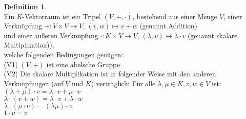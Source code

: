 \documentclass[10pt,a4paper,numbers=endperiod]{scrartcl}
\theoremstyle{definition}
\newtheorem{defi}[satz]{Definition}
\begin{document}
\begin{defi}
	$ $ \\
	Ein $K$-Vektorraum ist ein Tripel $(V,+, \cdot)$, bestehend aus einer Menge $V$, einer Verknüpfung $+: V \times V \rightarrow V$, $(v,w) \mapsto v+w$ (genannt Addition)\\
	und einer äußeren Verknüpfung $\cdot: K \times V \rightarrow V$, $(\lambda, v) \mapsto \lambda \cdot v$ (genannt skalare Multiplikation)),\\
	welche folgenden Bedingungen genügen: \\
	(V1) $(V,+)$ ist eine abelsche Gruppe\\
	(V2) Die skalare Multiplikation ist in folgender Weise mit den anderen Verknüpfungen (auf $V$ und $K$) verträglich: Für alle $\lambda, \mu \in K, v,w \in V$ ist:\\
	$(\lambda + \mu) \cdot v = \lambda \cdot v + \mu \cdot v$\\
	$\lambda \cdot (v+w) = \lambda \cdot v + \lambda \cdot w$\\
	$\lambda \cdot (\mu \cdot v) = (\lambda\mu) \cdot v$\\
	$1 \cdot v = v$
\end{defi}
\end{document}
